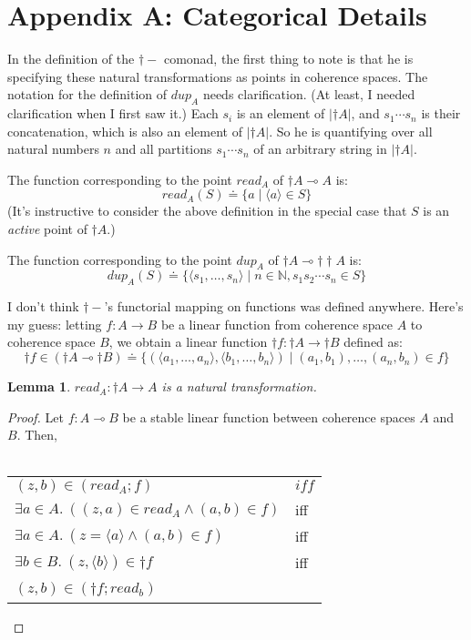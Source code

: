 \documentclass{article}
\newtheorem{lemma}{Lemma}
\begin{document}
\section*{Appendix A: Categorical Details}

In the definition of the $\dagger-$ comonad, the first thing to note is that he is specifying these natural transformations as points in coherence spaces. The notation for the definition of $\mathit{dup}_A$ needs clarification. (At least, I needed clarification when I first saw it.) Each $s_i$ is an element of $| \dagger A |$, and $s_1 \cdots s_n$ is their concatenation, which is also an element of $| \dagger A|$. So he is quantifying over all natural numbers $n$ and all partitions $s_1 \cdots s_n$ of an arbitrary string in $| \dagger A|$.

The function corresponding to the point $\mathit{read}_A$ of 
$\dagger A \multimap A$ is:
$$\mathit{read_A}(S) \doteq \{ a \mid \langle a \rangle \in S \}$$
(It's instructive to consider the above definition in the special case that $S$ is an \emph{active} point of $\dagger A$.)

The function corresponding to the point $\mathit{dup}_A$ of $\dagger A \multimap \dagger \dagger A$ is:
$$\mathit{dup}_A(S) \doteq \{ \langle s_1,\ldots,s_n \rangle \mid n \in \mathbb N, s_1 s_2 \cdots s_n \in S \} $$

I don't think $\dagger -$'s functorial mapping on functions was defined anywhere. Here's my guess: letting $f : A \to B$ be a linear function from coherence space $A$ to coherence space $B$, we obtain a linear function $\dagger f : \dagger A \to \dagger B$ defined as:
$$\dagger f \in (\dagger A \multimap \dagger B) \doteq \{ ( \langle a_1,\ldots,a_n \rangle, \langle b_1, \ldots, b_n \rangle)  \mid (a_1,b_1),\ldots,(a_n,b_n) \in f \}$$
 
\begin{lemma}
$\mathit{read_A} : \dagger A \to A$ is a natural transformation.
\end{lemma}

\begin{proof}
Let $f : A \multimap B$ be a stable linear function between coherence spaces $A$ and $B$. Then,\\~\\
\begin{tabular}{ll}
$(z,b) \in (\mathit{read}_A;f)$ & $\mathit{iff}$ \\
$\exists a \in A.~((z,a) \in \mathit{read}_A \wedge (a,b) \in f) $ & iff \\
$\exists a \in A.~(z = \langle a \rangle \wedge (a,b) \in f)$ & iff \\

$\exists b \in B.~(z,\langle b \rangle) \in \dagger f$ & iff \\
$(z,b) \in (\dagger f;\mathit{read}_b)$ & ~ 
\end{tabular} 
\end{proof}
\end{document}
